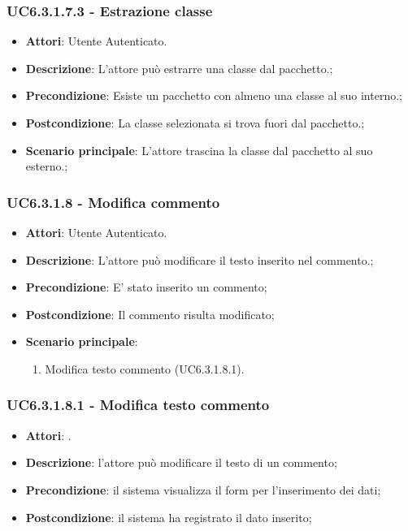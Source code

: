 \subsubsection{UC6.3.1.7.3 - Estrazione classe} 
\label{sssec:UC6.3.1.7.3} 
\begin{itemize} 
\item \textbf{Attori}: Utente Autenticato.
\item \textbf{Descrizione}: L'attore può estrarre una classe dal pacchetto.;
\item \textbf{Precondizione}: Esiste un pacchetto con almeno una classe al suo interno.;
\item \textbf{Postcondizione}: La classe selezionata si trova fuori dal pacchetto.;
\item \textbf{Scenario principale}: L'attore trascina la classe dal pacchetto al suo esterno.;\end{itemize} 
\subsubsection{UC6.3.1.8 - Modifica commento} 
\label{sssec:UC6.3.1.8} 
\begin{itemize} 
\item \textbf{Attori}: Utente Autenticato.
\item \textbf{Descrizione}: L'attore può modificare il testo inserito nel commento.;
\item \textbf{Precondizione}: E' stato inserito un commento;
\item \textbf{Postcondizione}: Il commento risulta modificato;
\item \textbf{Scenario principale}: \begin{enumerate}\item Modifica testo commento (UC6.3.1.8.1). 
 \end{enumerate}
\end{itemize} 
\subsubsection{UC6.3.1.8.1 - Modifica testo commento} 
\label{sssec:UC6.3.1.8.1} 
\begin{itemize} 
\item \textbf{Attori}: .
\item \textbf{Descrizione}: l'attore può modificare il testo di un commento;
\item \textbf{Precondizione}: il sistema visualizza il form per l'inserimento dei dati;
\item \textbf{Postcondizione}: il sistema ha registrato il dato inserito;
\end{itemize} 
